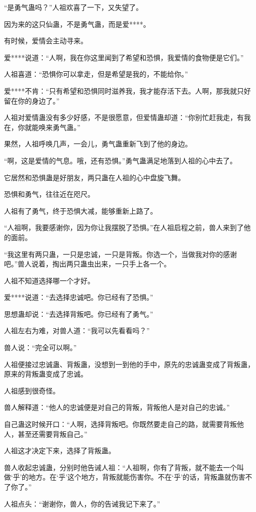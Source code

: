 \begin{this_body}
“是勇气蛊吗？”人祖欢喜了一下，又失望了。

因为来的这只仙蛊，不是勇气蛊，而是爱****。

有时候，爱情会主动寻来。

爱****说道：“人啊，我在你这里闻到了希望和恐惧，我爱情的食物便是它们。”

人祖喜道：“恐惧你可以拿走，但是希望是我的，不能给你。”

爱****不肯：“只有希望和恐惧同时滋养我，我才能存活下去。人啊，那我就只好留在你的身边了。”

人祖对爱情蛊没有多少好感，不是很愿意，但爱情蛊却道：“你别忙赶我走，有我在，你就能唤来勇气蛊。”

果然，人祖呼唤几声，一会儿，勇气蛊重新飞到了他的身边。

“啊，这是爱情的气息。哦，还有恐惧。”勇气蛊满足地落到人祖的心中去了。

它居然和恐惧蛊是好朋友，两只蛊在人祖的心中盘旋飞舞。

恐惧和勇气，往往近在咫尺。

人祖有了勇气，终于恐惧大减，能够重新上路了。

“人祖啊，我要感谢你，因为你让我摆脱了恐惧。”在人祖启程之前，兽人来到了他的面前。

“我这里有两只蛊，一只是忠诚，一只是背叛。你选一个，当做我对你的感谢吧。”兽人说着，掏出两只蛊虫出来，一只手上各一个。

人祖不知道选择哪一个才好。

爱****说道：“去选择忠诚吧。你已经有了恐惧。”

思想蛊却说：“去选择背叛吧。你已经有了勇气。”

人祖左右为难，对兽人道：“我可以先看看吗？”

兽人说：“完全可以啊。”

人祖便接过忠诚蛊、背叛蛊，没想到一到他的手中，原先的忠诚蛊变成了背叛蛊，原来的背叛蛊变成了忠诚。

人祖感到很奇怪。

兽人解释道：“他人的忠诚便是对自己的背叛，背叛他人是对自己的忠诚。”

自己蛊这时候开口：“人啊，选择背叛吧。你既然要走自己的路，就需要背叛他人，甚至还需要背叛自己。”

人祖这才决定下来，选择了背叛蛊。

兽人收起忠诚蛊，分别时他告诫人祖：“人祖啊，你有了背叛，就不能去一个叫做‘乎’的地方。在‘乎’这个地方，背叛就能伤害你。不在‘乎’的话，背叛蛊就伤害不了你了。”

人祖点头：“谢谢你，兽人，你的告诫我记下来了。”


\end{this_body}
